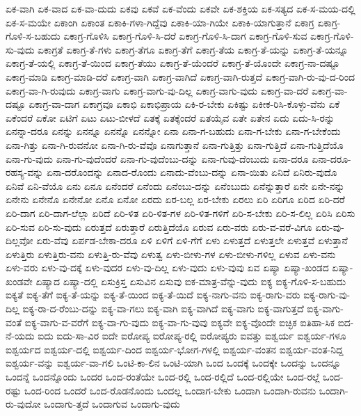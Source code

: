 {ಏಕ-ವಾಗಿ
ಏಕ-ವಾದ
ಏಕ-ವಾ-ದುದು
ಏಕವು
ಏಕವೆ
ಏಕ-ವೆಂದು
ಏಕವೇ
ಏಕ-ಶಕ್ತಿಯ
ಏಕ-ಸತ್ಯದ
ಏಕ-ಸ-ಮಯ-ದಲ್ಲಿ
ಏಕ-ಸ-ಮಯೇ
ಏಕಾಂಗಿ
ಏಕಾಂತ
ಏಕಾಕಿ-ಗಳಾ-ಗಿದ್ದೆವು
ಏಕಾಕಿ-ಯಾ-ಗಿಯೇ
ಏಕಾಕಿ-ಯಾಗುತ್ತಾನೆ
ಏಕಾಗ್ರ
ಏಕಾಗ್ರ-ಗೊಳಿ-ಸ-ಬಹುದು
ಏಕಾಗ್ರ-ಗೊಳಿಸಿ
ಏಕಾಗ್ರ-ಗೊಳಿ-ಸಿ-ದರೆ
ಏಕಾಗ್ರ-ಗೊಳಿ-ಸಿ-ದಾಗ
ಏಕಾಗ್ರ-ಗೊಳಿ-ಸುವ
ಏಕಾಗ್ರ-ಗೊಳಿ-ಸು-ವುದು
ಏಕಾಗ್ರತೆ
ಏಕಾಗ್ರ-ತೆ-ಗಳು
ಏಕಾಗ್ರ-ತೆಗೂ
ಏಕಾಗ್ರ-ತೆಗೆ
ಏಕಾಗ್ರ-ತೆಯ
ಏಕಾಗ್ರ-ತೆ-ಯನ್ನು
ಏಕಾಗ್ರ-ತೆ-ಯನ್ನೂ
ಏಕಾಗ್ರ-ತೆ-ಯಲ್ಲಿ
ಏಕಾಗ್ರ-ತೆ-ಯಿಂದ
ಏಕಾಗ್ರ-ತೆಯು
ಏಕಾಗ್ರ-ತೆ-ಯೆಂದರೆ
ಏಕಾಗ್ರ-ತೆ-ಯೊಂದೇ
ಏಕಾಗ್ರ-ನಾ-ದಷ್ಟೂ
ಏಕಾಗ್ರ-ಮಾಡಿ
ಏಕಾಗ್ರ-ಮಾಡಿ-ದರೆ
ಏಕಾಗ್ರ-ವಾಗಿ
ಏಕಾಗ್ರ-ವಾಗಿದೆ
ಏಕಾಗ್ರ-ವಾಗಿ-ರುತ್ತದೆ
ಏಕಾಗ್ರ-ವಾಗಿ-ರು-ವು-ದ-ರಿಂದ
ಏಕಾಗ್ರ-ವಾ-ಗಿ-ರುವುದು
ಏಕಾಗ್ರ-ವಾಗು
ಏಕಾಗ್ರ-ವಾಗು-ವು-ದಿಲ್ಲ
ಏಕಾಗ್ರ-ವಾಗು-ವುದು
ಏಕಾಗ್ರ-ವಾ-ದರೆ
ಏಕಾಗ್ರ-ವಾ-ದಷ್ಟೂ
ಏಕಾಗ್ರ-ವಾ-ದಾಗ
ಏಕಾಗ್ರವೂ
ಏಕಾಭಿ
ಏಕಾಭಿಪ್ರಾಯ
ಏಕಿ-ರ-ಬೇಕು
ಏಕಿಷ್ಟು
ಏಕೀಕ-ರಿಸಿ-ಕೊಳ್ಳು-ವೆನು
ಏಕೆ
ಏಕೆಂದರೆ
ಏಕೋ
ಏಟಿಗೆ
ಏಟು
ಏಟು-ಬೀಳದೆ
ಏತಕ್ಕೆ
ಏತಕ್ಕೆಂದರೆ
ಏತಯೈವ
ಏತೇ
ಏತೇನ
ಏದು
ಏದು-ಸಿ-ರನ್ನು
ಏನನ್ನಾ-ದರೂ
ಏನನ್ನು
ಏನನ್ನೂ
ಏನನ್ನೊ
ಏನನ್ನೋ
ಏನಾ
ಏನಾ-ಗ-ಬಹುದು
ಏನಾ-ಗ-ಬೇಕು
ಏನಾ-ಗ-ಬೇಕೆಂದು
ಏನಾ-ಗಿತ್ತು
ಏನಾ-ಗಿ-ರುವನೋ
ಏನಾ-ಗಿ-ರು-ವೆವೊ
ಏನಾಗುತ್ತಾನೆ
ಏನಾ-ಗುತ್ತಿತ್ತು
ಏನಾ-ಗುತ್ತಿದೆ
ಏನಾ-ಗುತ್ತಿದೆಯೊ
ಏನಾ-ಗು-ವುದು
ಏನಾ-ಗು-ವುದೆಂದರೆ
ಏನಾ-ಗು-ವುದೆಂಬು-ದನ್ನು
ಏನಾ-ಗುವು-ದೆಂಬುದು
ಏನಾ-ದರೂ
ಏನಾ-ದರೂ-ರಹಸ್ಯ-ವನ್ನು
ಏನಾ-ದರೊಂದನ್ನು
ಏನಾದ-ರೊಂದು
ಏನಾದು-ವೆಂಬು-ದನ್ನು
ಏನಾ-ಯಿತು
ಏನಿದೆ
ಏನಿರು-ವುದೊ
ಏನಿವೆ
ಏನಿ-ವೆಯೊ
ಏನು
ಏನೂ
ಏನೆಂದರೆ
ಏನೆಂದು
ಏನೆಂಬು-ದನ್ನು
ಏನೆಂಬುದು
ಏನೆನ್ನುತ್ತಾರೆ
ಏನೇ
ಏನೇ-ನನ್ನು
ಏನೇನು
ಏನೇನೊ
ಏನೇನೋ
ಏನೊ
ಏನೋ
ಏರದು
ಏರ-ಬಲ್ಲ
ಏರ-ಬೇಕು
ಏರಲು
ಏರಿ
ಏರಿಗೂ
ಏರಿದ
ಏರಿ-ದರೆ
ಏರಿ-ದಾಗ
ಏರಿ-ದಾಗ-ಲೆಲ್ಲಾ
ಏರಿದೆ
ಏರಿ-ಳಿತ
ಏರಿ-ಳಿತ-ಗಳ
ಏರಿ-ಳಿತ-ಗಳಿಗೆ
ಏರಿ-ಸ-ಬೇಕು
ಏರಿ-ಸ-ಲಿಲ್ಲ
ಏರಿಸಿ
ಏರಿಸು
ಏರಿ-ಸುವ
ಏರಿ-ಸು-ವುದು
ಏರುತ್ತದೆ
ಏರುತ್ತಾರೆ
ಏರುತ್ತಿದೆಯೊ
ಏರುವ
ಏರು-ವರು
ಏರು-ವ-ವರೆ-ವಿಗೂ
ಏರು-ವು-ದಿಲ್ಲವೋ
ಏರು-ವೆವು
ಏರ್ಪಡ-ಬೇಕಾ-ದರೂ
ಏಳಿ
ಏಳಿಗೆ
ಏಳಿ-ಗೆಗೆ
ಏಳು
ಏಳುತ್ತದೆ
ಏಳುತ್ತಲೇ
ಏಳುತ್ತವೆ
ಏಳುತ್ತಾನೆ
ಏಳುತ್ತಿರು
ಏಳುತ್ತಿರು-ವನು
ಏಳುತ್ತಿ-ರು-ವೆವು
ಏಳುತ್ವ
ಏಳು-ಬೀಳು-ಗಳ
ಏಳು-ಬೀಳು-ಗಳಿಲ್ಲ
ಏಳುವ
ಏಳು-ವನು
ಏಳು-ವರು
ಏಳು-ವು-ದಕ್ಕೆ
ಏಳು-ವುದರ
ಏಳು-ವು-ದಿಲ್ಲ
ಏಳು-ವುದು
ಏಳು-ವುವು
ಏವ
ಏಷ್ಯಾ
ಏಷ್ಯಾ-ಖಂಡದ
ಏಷ್ಯಾ-ಖಂಡವೇ
ಏಷ್ಯಾದ
ಏಷ್ಯಾ-ದಲ್ಲಿ
ಏಸುಕ್ರಿಸ್ತ
ಏಸುವಿನ
ಏಸುವು
ಐಕ-ಮಾತ್ರ-ವೆನ್ನು-ವುದು
ಐಕ್ಯ
ಐಕ್ಯ-ಗೊಳಿ-ಸ-ಬಹುದು
ಐಕ್ಯತೆ
ಐಕ್ಯ-ತೆಗೆ
ಐಕ್ಯ-ತೆ-ಯನ್ನು
ಐಕ್ಯ-ತೆ-ಯಿಂದ
ಐಕ್ಯ-ತೆ-ಯಿದೆ
ಐಕ್ಯ-ನಾಗು-ವನು
ಐಕ್ಯ-ರಾಗು-ವರು
ಐಕ್ಯ-ರಾಗು-ವು-ದಿಲ್ಲ
ಐಕ್ಯ-ರಾ-ದ-ರೆಂಬು-ದನ್ನು
ಐಕ್ಯ-ವಾ-ಗಲು
ಐಕ್ಯ-ವಾಗಿ
ಐಕ್ಯ-ವಾಗಿದೆ
ಐಕ್ಯ-ವಾಗು
ಐಕ್ಯ-ವಾಗುತ್ತದೆ
ಐಕ್ಯ-ವಾಗು-ವಂತೆ
ಐಕ್ಯ-ವಾಗು-ವ-ವರೆಗೆ
ಐಕ್ಯ-ವಾ-ಗು-ವುದು
ಐಕ್ಯ-ವಾ-ಗು-ವುವು
ಐಕ್ಯವೇ
ಐಕ್ಯ-ವೊಂದೇ
ಐಚ್ಛಿಕ
ಐತಿಹಾ-ಸಿಕ
ಐದ-ನೆ-ಯದು
ಐದು
ಐದು-ಸಾ-ವಿರ
ಐದೇ
ಐರೋಪ್ಯ
ಐರೋಪ್ಯ-ರಲ್ಲಿ
ಐರೋಪ್ಯರು
ಐವತ್ತು
ಐಶ್ವರ್ಯ
ಐಶ್ವರ್ಯ-ಗಳೂ
ಐಶ್ವರ್ಯದ
ಐಶ್ವರ್ಯ-ದಲ್ಲಿ
ಐಶ್ವರ್ಯ-ದಿಂದ
ಐಶ್ವರ್ಯ-ಭೋಗ-ಗಳಲ್ಲಿ
ಐಶ್ವರ್ಯ-ವಂತನ
ಐಶ್ವರ್ಯ-ವಂತ-ನಿದ್ದ
ಐಶ್ವರ್ಯ-ವನ್ನು
ಐಶ್ವರ್ಯ-ವಾ-ಗಲಿ
ಒಂಟಿ-ಕಾ-ಲಿನ
ಒಂಟಿ-ಯಾಗಿ
ಒಂದ
ಒಂದಕ್ಕೆ
ಒಂದಕ್ಕೇ
ಒಂದನ್ನು
ಒಂದನ್ನೂ
ಒಂದನ್ನೆ
ಒಂದನ್ನೊಂದು
ಒಂದರ
ಒಂದ-ರಂತೆಯೇ
ಒಂದ-ರಲ್ಲಿ
ಒಂದ-ರಲ್ಲಿದೆ
ಒಂದ-ರಲ್ಲಿಯೇ
ಒಂದ-ರಲ್ಲೆ
ಒಂದ-ರಷ್ಟು
ಒಂದ-ರಿಂದ
ಒಂದರೆ
ಒಂದ-ರೊಡನೊಂದು
ಒಂದಲ್ಲ
ಒಂದಾಗ-ಬೇಕು
ಒಂದಾಗಿ
ಒಂದಾಗಿ-ರುವನು
ಒಂದಾಗಿ-ರು-ವುದೋ
ಒಂದಾಗು-ತ್ತದೆ
ಒಂದಾಗುವ
ಒಂದಾಗು-ವುದು
}
